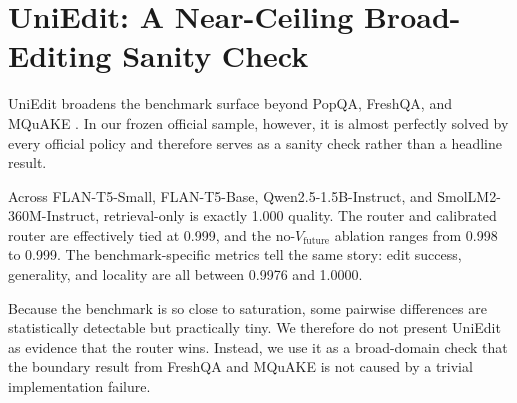 \section{UniEdit: A Near-Ceiling Broad-Editing Sanity Check}

UniEdit broadens the benchmark surface beyond PopQA, FreshQA, and MQuAKE \citep{chen2025uniedit}. In our frozen official sample, however, it is almost perfectly solved by every official policy and therefore serves as a sanity check rather than a headline result.

\begin{table}[h]
\centering
\small

\caption{Official UniEdit summary. All policies are near ceiling, so the benchmark is useful for breadth but largely nondiagnostic for router superiority in this setup.}
\label{tab:uniedit-main}
\end{table}

Across FLAN-T5-Small, FLAN-T5-Base, Qwen2.5-1.5B-Instruct, and SmolLM2-360M-Instruct, retrieval-only is exactly 1.000 quality. The router and calibrated router are effectively tied at 0.999, and the no-\(V_{\text{future}}\) ablation ranges from 0.998 to 0.999. The benchmark-specific metrics tell the same story: edit success, generality, and locality are all between 0.9976 and 1.0000.

Because the benchmark is so close to saturation, some pairwise differences are statistically detectable but practically tiny. We therefore do not present UniEdit as evidence that the router wins. Instead, we use it as a broad-domain check that the boundary result from FreshQA and MQuAKE is not caused by a trivial implementation failure.
